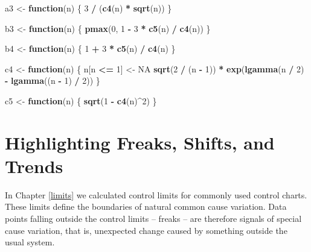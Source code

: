 \documentclass[
]{book}
\newenvironment{Shaded}{\begin{snugshade}}{\end{snugshade}}
\newcommand{\ConstantTok}[1]{\textcolor[rgb]{0.56,0.35,0.01}{#1}}
\newcommand{\ControlFlowTok}[1]{\textcolor[rgb]{0.13,0.29,0.53}{\textbf{#1}}}
\newcommand{\DecValTok}[1]{\textcolor[rgb]{0.00,0.00,0.81}{#1}}
\newcommand{\FunctionTok}[1]{\textcolor[rgb]{0.13,0.29,0.53}{\textbf{#1}}}
\newcommand{\NormalTok}[1]{#1}
\newcommand{\OtherTok}[1]{\textcolor[rgb]{0.56,0.35,0.01}{#1}}
\newcommand{\SpecialCharTok}[1]{\textcolor[rgb]{0.81,0.36,0.00}{\textbf{#1}}}
\begin{document}
\begin{Shaded}
\begin{Highlighting}[]
\NormalTok{a3 }\OtherTok{\textless{}{-}} \ControlFlowTok{function}\NormalTok{(n) \{}
  \DecValTok{3} \SpecialCharTok{/}\NormalTok{ (}\FunctionTok{c4}\NormalTok{(n) }\SpecialCharTok{*} \FunctionTok{sqrt}\NormalTok{(n))}
\NormalTok{\}}

\NormalTok{b3 }\OtherTok{\textless{}{-}} \ControlFlowTok{function}\NormalTok{(n) \{}
  \FunctionTok{pmax}\NormalTok{(}\DecValTok{0}\NormalTok{, }\DecValTok{1} \SpecialCharTok{{-}} \DecValTok{3} \SpecialCharTok{*} \FunctionTok{c5}\NormalTok{(n) }\SpecialCharTok{/} \FunctionTok{c4}\NormalTok{(n))}
\NormalTok{\}}

\NormalTok{b4 }\OtherTok{\textless{}{-}} \ControlFlowTok{function}\NormalTok{(n) \{}
  \DecValTok{1} \SpecialCharTok{+} \DecValTok{3} \SpecialCharTok{*} \FunctionTok{c5}\NormalTok{(n) }\SpecialCharTok{/} \FunctionTok{c4}\NormalTok{(n)}
\NormalTok{\}}

\NormalTok{c4 }\OtherTok{\textless{}{-}} \ControlFlowTok{function}\NormalTok{(n) \{}
\NormalTok{  n[n }\SpecialCharTok{\textless{}=} \DecValTok{1}\NormalTok{] }\OtherTok{\textless{}{-}} \ConstantTok{NA}
  \FunctionTok{sqrt}\NormalTok{(}\DecValTok{2} \SpecialCharTok{/}\NormalTok{ (n }\SpecialCharTok{{-}} \DecValTok{1}\NormalTok{)) }\SpecialCharTok{*} \FunctionTok{exp}\NormalTok{(}\FunctionTok{lgamma}\NormalTok{(n }\SpecialCharTok{/} \DecValTok{2}\NormalTok{) }\SpecialCharTok{{-}} \FunctionTok{lgamma}\NormalTok{((n }\SpecialCharTok{{-}} \DecValTok{1}\NormalTok{) }\SpecialCharTok{/} \DecValTok{2}\NormalTok{))}
\NormalTok{\}}

\NormalTok{c5 }\OtherTok{\textless{}{-}} \ControlFlowTok{function}\NormalTok{(n) \{}
  \FunctionTok{sqrt}\NormalTok{(}\DecValTok{1} \SpecialCharTok{{-}} \FunctionTok{c4}\NormalTok{(n)}\SpecialCharTok{\^{}}\DecValTok{2}\NormalTok{)}
\NormalTok{\}}
\end{Highlighting}
\end{Shaded}

\chapter{Highlighting Freaks, Shifts, and Trends}\label{highlighting}

In Chapter \ref{limits} we calculated control limits for commonly used control charts. These limits define the boundaries of natural common cause variation. Data points falling outside the control limits -- freaks -- are therefore signals of special cause variation, that is, unexpected change caused by something outside the usual system.
\end{document}
